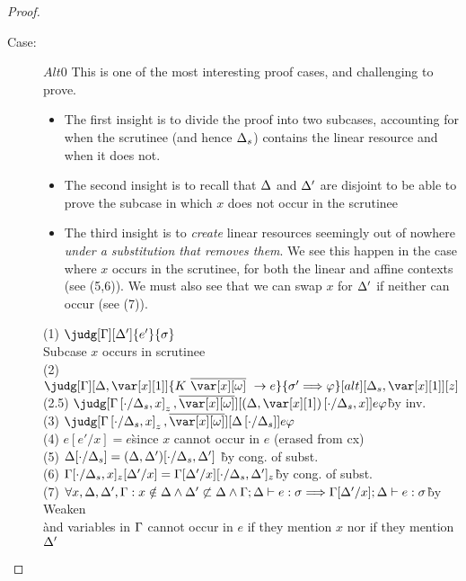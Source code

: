 \begin{proof}
\begin{description}
\item[Case:] $Alt0$
    This is one of the most interesting proof cases, and challenging to prove.
        \begin{itemize}
            \item The first insight is to divide the proof into two subcases, accounting
                for when the scrutinee (and hence $\Delta_s$) contains the linear resource and when it does not.
            \item The second insight is to recall that $\Delta$ and $\Delta'$ are
                disjoint to be able to prove the subcase in which $x$ does not
                occur in the scrutinee
            \item The third insight is to \emph{create} linear resources
                seemingly out of nowhere \emph{under a substitution that
                removes them}. We see this happen in the case where $x$ occurs
                in the scrutinee, for both the linear and affine contexts (see (5,6)).
                We must also see that we can swap $x$ for $\Delta'$ if neither can occur (see (7)).
        \end{itemize}
\begin{tabbing}
  (1) $\judg[\G][\D']{e'}{\s}$\\
  Subcase $x$ occurs in scrutinee\\
    (2) $\judg[\G][\D,\xl]{K~\ov{\xo}~\to e}{\s' \Longrightarrow \vp}[alt][\D_s,\xl][z]$\\
    (2.5) $\judg[\subst{\G}{\cdot}{\D_s,x}_z,\ov{\xo}][\subst{(\D,\xl)}{\cdot}{\D_s,x}]{e}{\vp}$\`by inv.\\
    (3) $\judg[\subst{\G}{\cdot}{\D_s,x}_z,\ov{\xo}][\subst{\D}{\cdot}{\D_s}]{e}{\vp}$\\
    (4) $e[e'/x] = e$\` since $x$ cannot occur in $e$ (erased from cx)\\
    (5) $\Delta[\cdot/\Delta_s] = (\Delta,\Delta')[\cdot/\Delta_s,\Delta']$   \` by cong. of subst.\\
    (6) $\Gamma[\cdot/\Delta_s,x]_z[\Delta'/x] = \Gamma[\Delta'/x][\cdot/\Delta_s,\Delta']_z$\` by cong. of subst.\\%
    (7) $\forall x,\Delta,\Delta',\Gamma:x\notin\Delta \land \Delta'\not\subset\Delta \land \Gamma;\Delta \vdash e :\sigma \Longrightarrow \Gamma[\Delta'/x];\Delta \vdash e : \sigma$\` by Weaken\\
    \` and variables in $\Gamma$ cannot occur in $e$ if they mention $x$ nor if they mention $\Delta'$ \\

\end{tabbing}
\end{description}
\end{proof}

